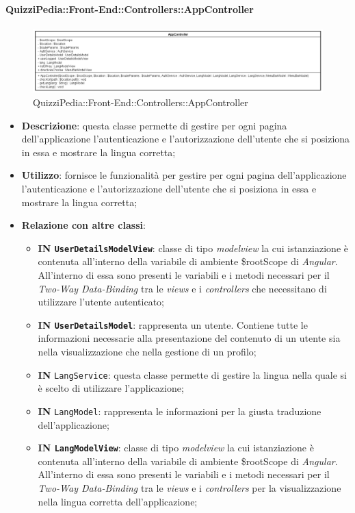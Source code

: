 \paragraph{QuizziPedia::Front-End::Controllers::AppController}
\begin{figure} [ht]
	\centering
	\includegraphics[scale=0.35]{UML/Classi/Front-End/QuizziPedia_Front-end_Controller_AppController.png}
	\caption{QuizziPedia::Front-End::Controllers::AppController}
\end{figure} \FloatBarrier
\begin{itemize}
	\item \textbf{Descrizione}: questa classe permette di gestire per ogni pagina dell'applicazione l'autenticazione e l'autorizzazione dell'utente che si posiziona in essa e mostrare la lingua corretta;
	\item \textbf{Utilizzo}: fornisce le funzionalità per gestire per ogni pagina dell'applicazione l'autenticazione e l'autorizzazione dell'utente che si posiziona in essa e mostrare la lingua corretta;
	\item \textbf{Relazione con altre classi}:
	\begin{itemize}
		\item \textbf{IN \texttt{UserDetailsModelView}}: classe di tipo \textit{modelview} la cui istanziazione è contenuta all'interno della variabile di ambiente \$rootScope di \textit{Angular}. All'interno di essa sono presenti le variabili e i metodi necessari per il \textit{Two-Way Data-Binding} tra le \textit{views} e i \textit{controllers} che necessitano di utilizzare l'utente autenticato;
		\item \textbf{IN \texttt{UserDetailsModel}}: rappresenta un utente. Contiene tutte le informazioni necessarie alla presentazione del contenuto di un utente sia nella visualizzazione che nella gestione di un profilo;
		\item \textbf{IN} \texttt{LangService}: questa classe permette di gestire la lingua nella quale si è scelto di utilizzare l'applicazione;
		\item \textbf{IN} \texttt{LangModel}: rappresenta le informazioni per la giusta traduzione dell'applicazione;
		\item \textbf{IN \texttt{LangModelView}}: classe di tipo \textit{modelview} la cui istanziazione è contenuta all'interno della variabile di ambiente \$rootScope di \textit{Angular}. All'interno di essa sono presenti le variabili e i metodi necessari per il \textit{Two-Way Data-Binding} tra le \textit{views} e i \textit{controllers} per la visualizzazione nella lingua corretta dell'applicazione;

\end{itemize}
\end{itemize}
